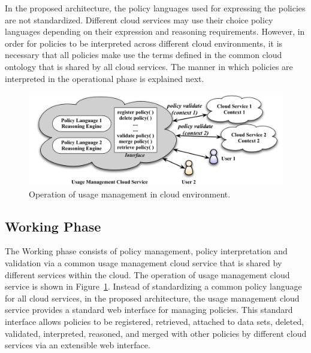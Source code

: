 \documentclass[notitlepage]{book}
\begin{document}
\begin{doublespace}
In the proposed architecture, the policy languages used for expressing the policies are not standardized. Different cloud services may use their choice policy languages depending on their expression and reasoning requirements. However, in order for policies to be interpreted across different cloud environments, it is necessary that all policies make use the terms defined in the common cloud ontology that is shared by all cloud services. The manner in which policies are interpreted in the operational phase is explained next. 

\begin{figure}[!t]
\centering
\includegraphics[width=13cm]{cloud-working}
\caption{Operation of usage management in cloud environment.}
\label{fig:cloud-working}
\end{figure}

\subsection{Working Phase}
The Working phase consists of policy management, policy interpretation and validation via a common usage management cloud service that is shared by different services within the cloud. The operation of usage management cloud service is shown in Figure~\ref{fig:cloud-working}. Instead of standardizing a common policy language for all cloud services, in the proposed architecture, the usage management cloud service provides a standard web interface for managing policies. This standard interface allows policies to be registered, retrieved, attached to data sets, deleted, validated, interpreted, reasoned, and merged with other policies by different cloud services via an extensible web interface. 


\end{doublespace}
\end{document}
